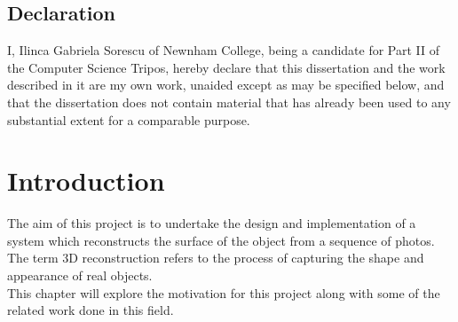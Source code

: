 \documentclass[12pt,a4paper,twoside,openright]{report}
\begin{document}
\newpage
\section*{Declaration}

I, Ilinca Gabriela Sorescu of Newnham College, being a candidate for Part II of the Computer Science Tripos, hereby declare
that this dissertation and the work described in it are my own work,
unaided except as may be specified below, and that the dissertation
does not contain material that has already been used to any substantial
extent for a comparable purpose.

\bigskip
{}

\medskip
{}

\tableofcontents

\listoffigures

\newpage


\pagestyle{headings}
\chapter{Introduction}
The aim of this project is to undertake the design and implementation of a system which reconstructs the surface of the object from a sequence of photos.\\
The term 3D reconstruction refers to the process of capturing the shape and appearance of real objects.\\
\linebreak
This chapter will explore the motivation for this project along with some of the related work done in this field. 
\end{document}
